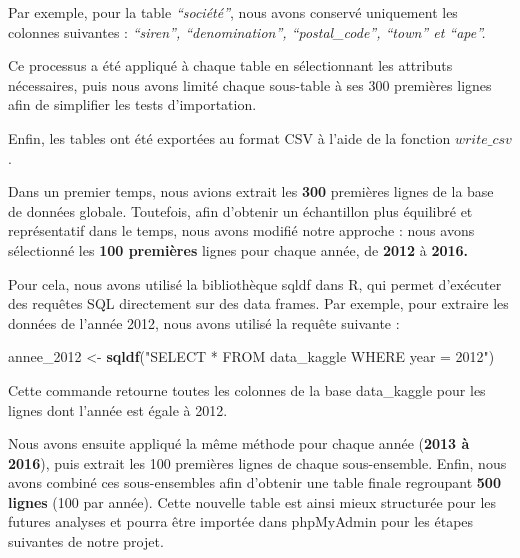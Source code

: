 \documentclass[mstat,12pt]{unswthesis}
\newenvironment{Shaded}{\begin{snugshade}}{\end{snugshade}}
\newcommand{\FunctionTok}[1]{\textcolor[rgb]{0.13,0.29,0.53}{\textbf{#1}}}
\newcommand{\NormalTok}[1]{#1}
\newcommand{\OtherTok}[1]{\textcolor[rgb]{0.56,0.35,0.01}{#1}}
\newcommand{\StringTok}[1]{\textcolor[rgb]{0.31,0.60,0.02}{#1}}
\begin{document}
\medskip

Par exemple, pour la table \emph{``société''}, nous avons conservé
uniquement les colonnes suivantes : \emph{``siren'', ``denomination'',
``postal\_code'', ``town'' et ``ape''.}

Ce processus a été appliqué à chaque table en sélectionnant les
attributs nécessaires, puis nous avons limité chaque sous-table à ses
300 premières lignes afin de simplifier les tests d'importation.

\medskip

Enfin, les tables ont été exportées au format CSV à l'aide de la
fonction \(write\_csv\).

\medskip

Dans un premier temps, nous avions extrait les \textbf{300} premières
lignes de la base de données globale. Toutefois, afin d'obtenir un
échantillon plus équilibré et représentatif dans le temps, nous avons
modifié notre approche : nous avons sélectionné les \textbf{100
premières} lignes pour chaque année, de \textbf{2012} à \textbf{2016.}

\medskip

Pour cela, nous avons utilisé la bibliothèque sqldf dans R, qui permet
d'exécuter des requêtes SQL directement sur des data frames. Par
exemple, pour extraire les données de l'année 2012, nous avons utilisé
la requête suivante :

\begin{Shaded}
\begin{Highlighting}[]
\NormalTok{annee\_2012 }\OtherTok{\textless{}{-}} \FunctionTok{sqldf}\NormalTok{(}\StringTok{"SELECT * FROM data\_kaggle WHERE year = 2012"}\NormalTok{)}
\end{Highlighting}
\end{Shaded}

\medskip

Cette commande retourne toutes les colonnes de la base data\_kaggle pour
les lignes dont l'année est égale à 2012.

\medskip

Nous avons ensuite appliqué la même méthode pour chaque année
(\textbf{2013 à 2016}), puis extrait les 100 premières lignes de chaque
sous-ensemble. Enfin, nous avons combiné ces sous-ensembles afin
d'obtenir une table finale regroupant \textbf{500 lignes} (100 par
année). Cette nouvelle table est ainsi mieux structurée pour les futures
analyses et pourra être importée dans phpMyAdmin pour les étapes
suivantes de notre projet.

\medskip
\end{document}
